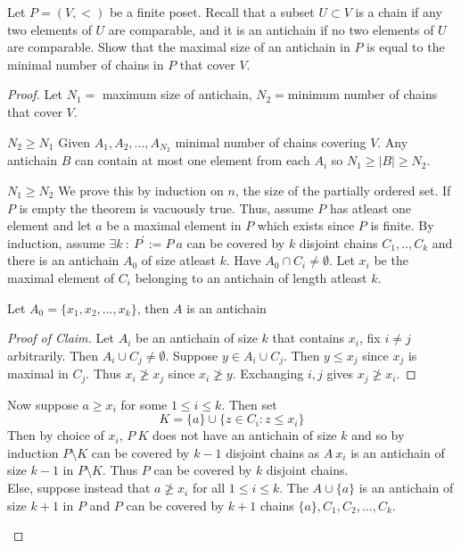 \documentclass[a4paper]{article}
\begin{document}
	\begin{question}[Question 1]
	Let $P = (V, <)$ be a finite poset. Recall that a subset $U \subset V$ is a chain if any two elements of $U$ are comparable, and it is an antichain if no two elements of $U$ are comparable. Show that the maximal size of an antichain in $P$ is equal to the minimal number of chains in $P$ that cover $V$.
	\end{question}
	\begin{proof}
	Let $N_1 = $ maximum size of antichain, $N_2 = $minimum number of chains that cover $V$.
	\begin{description}
	\item \underline{$N_2 \geq N_1$} Given $A_1, A_2, ..., A_{N_2}$ minimal number of chains covering $V$. Any antichain $B$ can contain at most one element from each $A_i$ so $N_1 \geq |B| \geq N_2$.
	\item \underline{$N_1 \geq N_2$} We prove this by induction on $n$, the size of the partially ordered set. If $P$ is empty the theorem is vacuously true. Thus, assume $P$ has atleast one element and let $a$ be a maximal element in $P$ which exists since $P$ is finite. By induction, assume $\exists k \ : \ P^{'} := P \ {a}$ can be covered by $k$ disjoint chains $C_1,..,C_k$ and there is an antichain $A_0$ of size atleast $k$. Have $A_0 \cap C_i \not = \emptyset$. Let $x_i$ be the maximal element of $C_i$ belonging to an antichain of length atleast $k$.\\
	\begin{remark}[Claim] Let $A_0 = \{x_1,x_2,...,x_k\}$, then $A$ is an antichain
	\begin{proof}[Proof of Claim]\renewcommand{\qedsymbol}{}
	Let $A_i$ be an antichain of size $k$ that contains $x_i$, fix $i \not = j$ arbitrarily. Then $A_i \cup C_j \not = \emptyset$. Suppose $y \in A_i \cup C_j$. Then $y \leq x_j$ since $x_j$ is maximal in $C_j$. Thus $x_i \not \geq x_j$ since $x_i \not \geq y$. Exchanging $i,j$ gives $x_j \not \geq x_i$.
	\end{proof}
	\end{remark}
	Now suppose $a \geq x_i$ for some $1 \leq i \leq k$. Then set
	\[K = \{a\} \cup \{z \in C_i : z \leq x_i\}\]
	Then by choice of $x_i$, $P \ K$ does not have an antichain of size $k$ and so by induction $P \setminus K$ can be covered by $k-1$ disjoint chains as $A \ {x_i}$ is an antichain of size $k-1$ in $P \setminus K$. Thus $P$ can be covered by $k$ disjoint chains.\\
	Else, suppose instead that $a \not \geq x_i$ for all $1 \leq i \leq k$. The $A \cup \{a\}$ is an antichain of size $k+1$ in $P$ and $P$ can be covered by $k+1$ chains $\{a\}, C_1, C_2,...,C_k$.
	\end{description}
	\end{proof}
\end{document}
